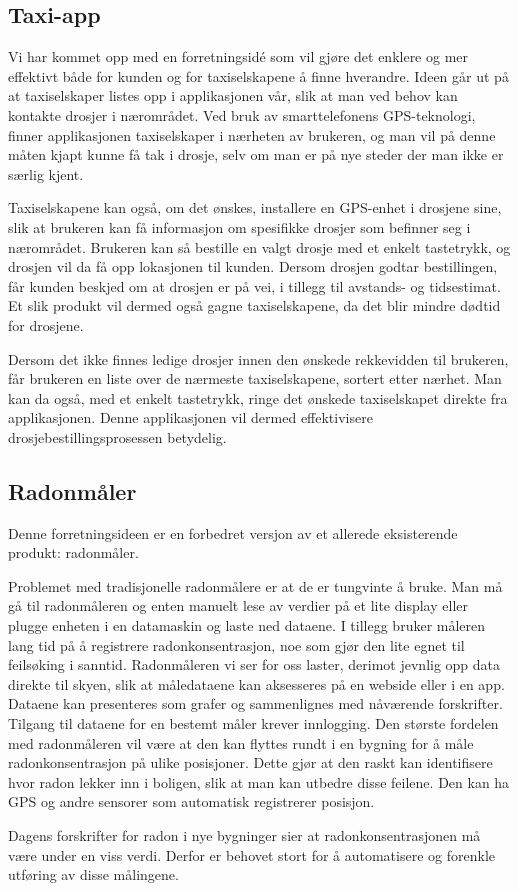 \subsection{Taxi-app}

Vi har kommet opp med en forretningsidé som vil gjøre det enklere og mer effektivt både for kunden og for taxiselskapene å finne hverandre. Ideen går ut på at taxiselskaper listes opp i applikasjonen vår, slik at man ved behov kan kontakte drosjer i nærområdet. Ved bruk av smarttelefonens GPS-teknologi, finner applikasjonen taxiselskaper i nærheten av brukeren, og man vil på denne måten kjapt kunne få tak i drosje, selv om man er på nye steder der man ikke er særlig kjent.

Taxiselskapene kan også, om det ønskes, installere en GPS-enhet i drosjene sine, slik at brukeren kan få informasjon om spesifikke drosjer som befinner seg i nærområdet.
Brukeren kan så bestille en valgt drosje med et enkelt tastetrykk, og drosjen vil da få opp lokasjonen til kunden.
Dersom drosjen godtar bestillingen, får kunden beskjed om at drosjen er på vei, i tillegg til avstands- og tidsestimat.
Et slik produkt vil dermed også gagne taxiselskapene, da det blir mindre dødtid for drosjene.

Dersom det ikke finnes ledige drosjer innen den ønskede rekkevidden til brukeren, får brukeren en liste over de nærmeste taxiselskapene, sortert etter nærhet. Man kan da også, med et enkelt tastetrykk, ringe det ønskede taxiselskapet direkte fra applikasjonen. Denne applikasjonen vil dermed effektivisere drosjebestillingsprosessen betydelig.


\subsection{Radonmåler}

Denne forretningsideen er en forbedret versjon av et allerede eksisterende produkt: radonmåler.

Problemet med tradisjonelle radonmålere er at de er tungvinte å bruke.
Man må gå til radonmåleren og enten manuelt lese av verdier på et lite display eller plugge enheten i en datamaskin og laste ned dataene.
I tillegg bruker måleren lang tid på å registrere radonkonsentrasjon, noe som gjør den lite egnet til feilsøking i sanntid.
Radonmåleren vi ser for oss laster, derimot jevnlig opp data direkte til skyen, slik at måledataene kan aksesseres på en webside eller i en app.
Dataene kan presenteres som grafer og sammenlignes med nåværende forskrifter.
Tilgang til dataene for en bestemt måler krever innlogging.
Den største fordelen med radonmåleren vil være at den kan flyttes rundt i en bygning for å måle radonkonsentrasjon på ulike posisjoner. Dette gjør at den raskt kan identifisere hvor radon lekker inn i boligen, slik at man kan utbedre disse feilene.
Den kan ha GPS og andre sensorer som automatisk registrerer posisjon.

Dagens forskrifter for radon i nye bygninger sier at radonkonsentrasjonen må være under en viss verdi.
Derfor er behovet stort for å automatisere og forenkle utføring av disse målingene.
